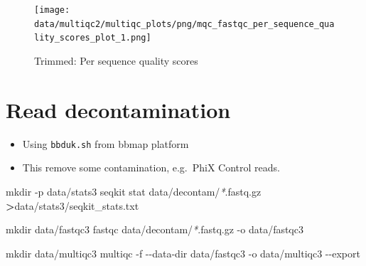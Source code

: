 \documentclass[
  12pt,
  openany]{book}
\newenvironment{Shaded}{\begin{snugshade}}{\end{snugshade}}
\newcommand{\AttributeTok}[1]{\textcolor[rgb]{0.77,0.63,0.00}{#1}}
\newcommand{\ControlFlowTok}[1]{\textcolor[rgb]{0.13,0.29,0.53}{\textbf{#1}}}
\newcommand{\DataTypeTok}[1]{\textcolor[rgb]{0.13,0.29,0.53}{#1}}
\newcommand{\ExtensionTok}[1]{#1}
\newcommand{\FunctionTok}[1]{\textcolor[rgb]{0.00,0.00,0.00}{#1}}
\newcommand{\KeywordTok}[1]{\textcolor[rgb]{0.13,0.29,0.53}{\textbf{#1}}}
\newcommand{\NormalTok}[1]{#1}
\newcommand{\OperatorTok}[1]{\textcolor[rgb]{0.81,0.36,0.00}{\textbf{#1}}}
\newcommand{\PreprocessorTok}[1]{\textcolor[rgb]{0.56,0.35,0.01}{\textit{#1}}}
\newcommand{\StringTok}[1]{\textcolor[rgb]{0.31,0.60,0.02}{#1}}
\newcommand{\VariableTok}[1]{\textcolor[rgb]{0.00,0.00,0.00}{#1}}
\providecommand{\tightlist}{%
  \setlength{\itemsep}{0pt}\setlength{\parskip}{0pt}}
\begin{document}
\begin{figure}
\centering
\texttt{[image: data/multiqc2/multiqc\_plots/png/mqc\_fastqc\_per\_sequence\_quality\_scores\_plot\_1.png]}
\caption{Trimmed: Per sequence quality scores}
\end{figure}

\hypertarget{read-decontamination}{%
\section{Read decontamination}\label{read-decontamination}}

\begin{itemize}
\tightlist
\item
  Using \texttt{bbduk.sh} from bbmap platform
\item
  This remove some contamination, e.g.~PhiX Control reads.
\end{itemize}

\begin{Shaded}
\end{Shaded}

\begin{Shaded}
\begin{Highlighting}[]
\FunctionTok{mkdir} \AttributeTok{{-}p}\NormalTok{ data/stats3  }
\ExtensionTok{seqkit}\NormalTok{ stat data/decontam/}\PreprocessorTok{*}\NormalTok{.fastq.gz }\OperatorTok{\textgreater{}}\NormalTok{data/stats3/seqkit\_stats.txt}

\FunctionTok{mkdir}\NormalTok{ data/fastqc3}
\ExtensionTok{fastqc}\NormalTok{ data/decontam/}\PreprocessorTok{*}\NormalTok{.fastq.gz }\AttributeTok{{-}o}\NormalTok{ data/fastqc3}

\FunctionTok{mkdir}\NormalTok{ data/multiqc3}
\ExtensionTok{multiqc} \AttributeTok{{-}f} \AttributeTok{{-}{-}data{-}dir}\NormalTok{ data/fastqc3 }\AttributeTok{{-}o}\NormalTok{ data/multiqc3 }\AttributeTok{{-}{-}export}
\end{Highlighting}
\end{Shaded}
\end{document}
